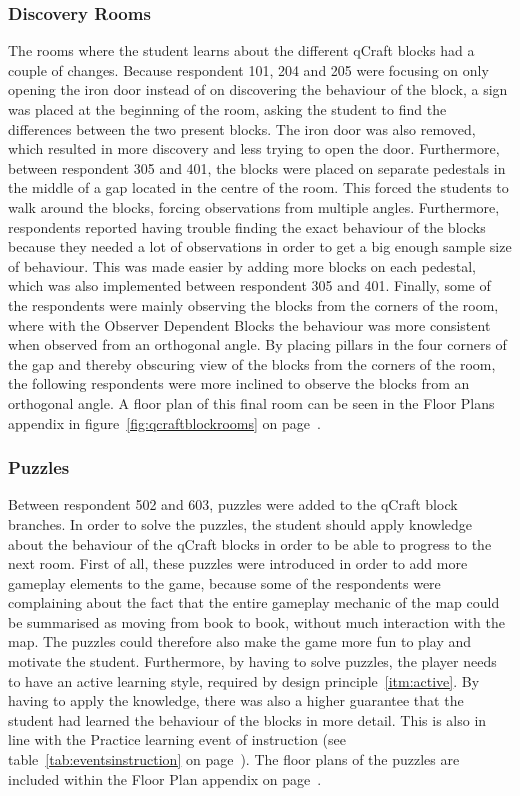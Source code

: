 \documentclass[11pt,twoside]{report} %
\begin{document}
\subsubsection{Discovery Rooms}

The rooms where the student learns about the different qCraft blocks had a couple of changes. Because respondent 101, 204 and 205 were focusing on only opening the iron door instead of on discovering the behaviour of the block, a sign was placed at the beginning of the room, asking the student to find the differences between the two present blocks. The iron door was also removed, which resulted in more discovery and less trying to open the door. Furthermore, between respondent 305 and 401, the blocks were placed on separate pedestals in the middle of a gap located in the centre of the room. This forced the students to walk around the blocks, forcing observations from multiple angles. Furthermore, respondents reported having trouble finding the exact behaviour of the blocks because they needed a lot of observations in order to get a big enough sample size of behaviour. This was made easier by adding more blocks on each pedestal, which was also implemented between respondent 305 and 401. Finally, some of the respondents were mainly observing the blocks from the corners of the room, where with the Observer Dependent Blocks the behaviour was more consistent when observed from an orthogonal angle. By placing pillars in the four corners of the gap and thereby obscuring view of the blocks from the corners of the room, the following respondents were more inclined to observe the blocks from an orthogonal angle. A floor plan of this final room can be seen in the Floor Plans appendix in figure~\ref{fig:qcraftblockrooms} on page~\pageref{fig:qcraftblockrooms}.

\subsubsection{Puzzles}

Between respondent 502 and 603, puzzles were added to the qCraft block branches. In order to solve the puzzles, the student should apply knowledge about the behaviour of the qCraft blocks in order to be able to progress to the next room. First of all, these puzzles were introduced in order to add more gameplay elements to the game, because some of the respondents were complaining about the fact that the entire gameplay mechanic of the map could be summarised as moving from book to book, without much interaction with the map. The puzzles could therefore also make the game more fun to play and motivate the student. Furthermore, by having to solve puzzles, the player needs to have an active learning style, required by design principle~\ref{itm:active}. By having to apply the knowledge, there was also a higher guarantee that the student had learned the behaviour of the blocks in more detail. This is also in line with the Practice learning event of instruction (see table~\ref{tab:eventsinstruction} on page~\pageref{tab:eventsinstruction}). The floor plans of the puzzles are included within the Floor Plan appendix on page~\pageref{app:floorplans}.
\end{document}
